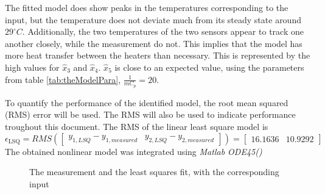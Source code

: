 The fitted model does show peaks in the temperatures corresponding to the input, but the temperature does not deviate much from its steady state around $29^{\circ}C$. Additionally, the two temperatures of the two sensors appear to track one another closely, while the measurement do not. This implies that the model has more heat transfer between the heaters than necessary. This is represented by the high values for $\hat{x}_3$ and $\hat{x}_4$. $\hat{x}_5$ is close to an expected value, using the parameters from table \ref{tab:theModelPara}, $\frac{1}{mC_p} = 20$.

To quantify the performance of the identified model, the root mean squared (RMS) error will be used. The RMS will also be used to indicate performance troughout this document. The RMS of the linear least square model is
$$
\epsilon_{\text{LSQ}} = RMS(\begin{bmatrix} y_{1,LSQ} - y_{1,measured} & y_{2,LSQ} - y_{2,measured} \end{bmatrix}) = \begin{bmatrix} 16.1636 & 10.9292 \end{bmatrix}
$$
The obtained nonlinear model was integrated using \textit{Matlab ODE45()} 
\begin{figure}
    \centering
    
    \caption{The measurement and the least squares fit, with the corresponding input}
    \label{fig:lsqfit}
\end{figure}